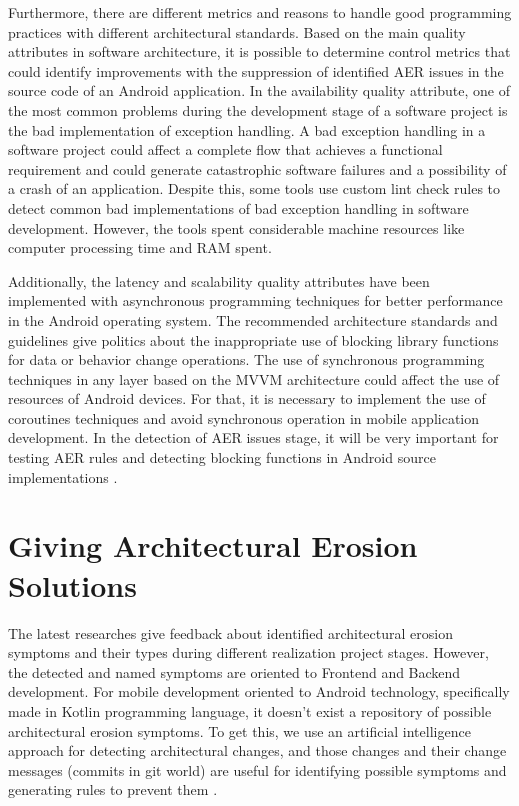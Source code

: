 Furthermore, there are different metrics and reasons to handle good programming practices with different architectural standards. Based on the main quality attributes in software architecture, it is possible to determine control metrics that could identify improvements with the suppression of identified AER issues in the source code of an Android application.
In the availability quality attribute, one of the most common problems during the development stage of a software project is the bad implementation of exception handling. A bad exception handling in a software project could affect a complete flow that achieves a functional requirement and could generate catastrophic software failures and a possibility of a crash of an application. Despite this, some tools use custom lint check rules to detect common bad implementations of bad exception handling in software development. However, the tools spent considerable machine resources like computer processing time and RAM spent. \cite{handle-exceptions-references}

Additionally, the latency and scalability quality attributes have been implemented with asynchronous programming techniques for better performance in the Android operating system. The recommended architecture standards and guidelines give politics about the inappropriate use of blocking library functions for data or behavior change operations. The use of synchronous programming techniques in any layer based on the MVVM architecture could affect the use of resources of Android devices. For that, it is necessary to implement the use of coroutines techniques and avoid synchronous operation in mobile application development. In the detection of AER issues stage, it will be very important for testing AER rules and detecting blocking functions in Android source implementations \cite{performance-coroutines-reference}.


\section{Giving Architectural Erosion Solutions}
The latest researches give feedback about identified architectural erosion symptoms and their types during different realization project stages. However, the detected and named symptoms are oriented to Frontend and Backend development. For mobile development oriented to Android technology, specifically made in Kotlin programming language, it doesn't exist a repository of possible architectural erosion symptoms. To get this, we use an artificial intelligence approach for detecting architectural changes, and those changes and their change messages (commits in git world) are useful for identifying possible symptoms and generating rules to prevent them \cite{aer-metrics-paper}.


